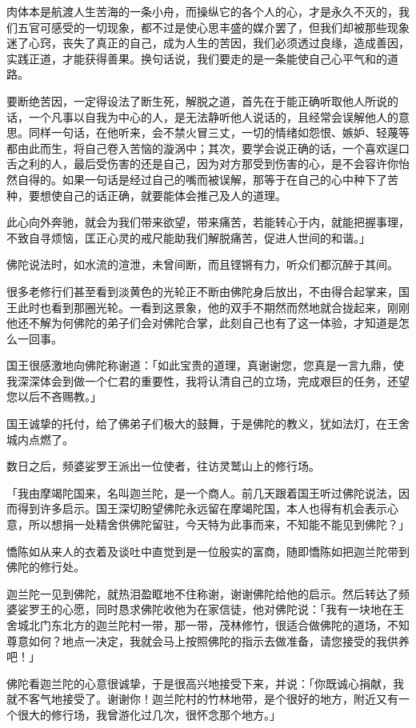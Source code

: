 \documentclass[12pt,twoside,openany]{book}
\begin{document}
肉体本是航渡人生苦海的一条小舟，而操纵它的各个人的心，才是永久不灭的，我们五官可感受的一切现象，都不过是使心思丰盛的媒介罢了，但我们却被那些现象迷了心窍，丧失了真正的自己，成为人生的苦因，我们必须透过良缘，造成善因，实践正道，才能获得善果。换句话说，我们要走的是一条能使自己心平气和的道路。

要断绝苦因，一定得设法了断生死，解脱之道，首先在于能正确听取他人所说的话，一个凡事以自我为中心的人，是无法静听他人说话的，且经常会误解他人的意思。同样一句话，在他听来，会不禁火冒三丈，一切的情绪如怨恨、嫉妒、轻蔑等都由此而生，将自己卷入苦恼的漩涡中；其次，要学会说正确的话，一个喜欢逞口舌之利的人，最后受伤害的还是自己，因为对方那受到伤害的心，是不会容许你怡然自得的。如果一句话是经过自己的嘴而被误解，那等于在自己的心中种下了苦种，要想使自己的话正确，就要能体会推己及人的道理。

此心向外奔驰，就会为我们带来欲望，带来痛苦，若能转心于内，就能把握事理，不致自寻烦恼，匡正心灵的戒尺能助我们解脱痛苦，促进人世间的和谐。」

佛陀说法时，如水流的渲泄，未曾间断，而且铿锵有力，听众们都沉醉于其间。

很多老修行们甚至看到淡黄色的光轮正不断由佛陀身后放出，不由得合起掌来，国王此时也看到那圈光轮。一看到这景象，他的双手不期然而然地就合拢起来，刚刚他还不解为何佛陀的弟子们会对佛陀合掌，此刻自己也有了这一体验，才知道是怎么一回事。

国王很感激地向佛陀称谢道：「如此宝贵的道理，真谢谢您，您真是一言九鼎，使我深深体会到做一个仁君的重要性，我将认清自己的立场，完成艰巨的任务，还望您以后不吝赐教。」

国王诚挚的托付，给了佛弟子们极大的鼓舞，于是佛陀的教义，犹如法灯，在王舍城内点燃了。

数日之后，频婆娑罗王派出一位使者，往访灵鹫山上的修行场。

「我由摩竭陀国来，名叫迦兰陀，是一个商人。前几天跟着国王听过佛陀说法，因而得到许多启示。国王深切盼望佛陀永远留在摩竭陀国，本人也得有机会表示心意，所以想捐一处精舍供佛陀留驻，今天特为此事而来，不知能不能见到佛陀？」

憍陈如从来人的衣着及谈吐中直觉到是一位殷实的富商，随即憍陈如把迦兰陀带到佛陀的修行处。

迦兰陀一见到佛陀，就热泪盈眶地不住称谢，谢谢佛陀给他的启示。然后转达了频婆娑罗王的心愿，同时恳求佛陀收他为在家信徒，他对佛陀说：「我有一块地在王舍城北门东北方的迦兰陀村一带，那一带，茂林修竹，很适合做佛陀的道场，不知尊意如何？地点一决定，我就会马上按照佛陀的指示去做准备，请您接受的我供养吧！」

佛陀看迦兰陀的心意很诚挚，于是很高兴地接受下来，并说：「你既诚心捐献，我就不客气地接受了。谢谢你！迦兰陀村的竹林地带，是个很好的地方，附近又有一个很大的修行场，我曾游化过几次，很怀念那个地方。」
\end{document}
